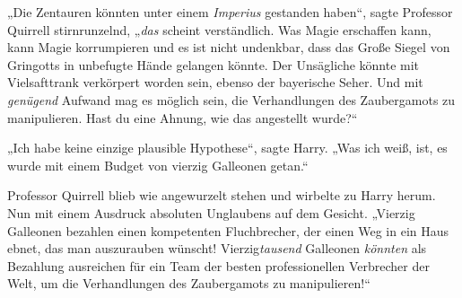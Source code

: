 „Die Zentauren könnten unter einem \emph{Imperius} gestanden haben“, sagte Professor Quirrell stirnrunzelnd,
„\emph{das} scheint verständlich. Was Magie erschaffen kann, kann Magie korrumpieren und es ist nicht undenkbar, dass das Große Siegel von Gringotts in unbefugte Hände gelangen könnte. Der Unsägliche könnte mit Vielsafttrank verkörpert worden sein, ebenso der bayerische Seher.%
Und mit \emph{genügend} Aufwand mag es möglich sein, die Verhandlungen des Zaubergamots zu manipulieren. Hast du eine Ahnung, wie das angestellt wurde?“

„Ich habe keine einzige plausible Hypothese“, sagte Harry.
„Was ich weiß, ist, es wurde mit einem Budget von vierzig Galleonen getan.“

Professor Quirrell blieb wie angewurzelt stehen und wirbelte zu Harry herum. Nun mit einem Ausdruck absoluten Unglaubens auf dem Gesicht.
„Vierzig Galleonen bezahlen einen kompetenten Fluchbrecher, der einen Weg in ein Haus ebnet, das man auszurauben wünscht! Vierzig{}\emph{tausend} Galleonen \emph{könnten} als Bezahlung ausreichen für ein Team der besten professionellen Verbrecher der Welt, um die Verhandlungen des Zaubergamots zu manipulieren!“%

